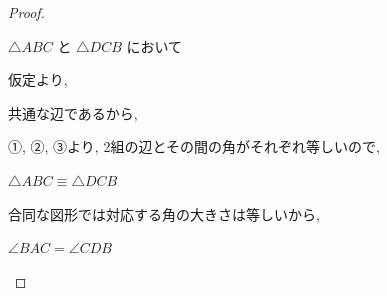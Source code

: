 \begin{proof}\mbox{}\\
    \begin{hiddenanswer}
        $\triangle ABC$ と $\triangle DCB$ において

        \vspace{0.5em}
        仮定より,

        \vspace{0.3em}

        \vspace{0.3em}

        \vspace{0.3em}
        共通な辺であるから,

        \vspace{0.3em}

        \vspace{0.3em}
        ①, ②, ③より, 2組の辺とその間の角がそれぞれ等しいので,

        \vspace{0.3em}
        $\triangle ABC \equiv \triangle DCB$

        \vspace{0.3em}
        合同な図形では対応する角の大きさは等しいから,

        \vspace{0.3em}
        $\angle BAC = \angle CDB$
    \end{hiddenanswer}
\end{proof}
